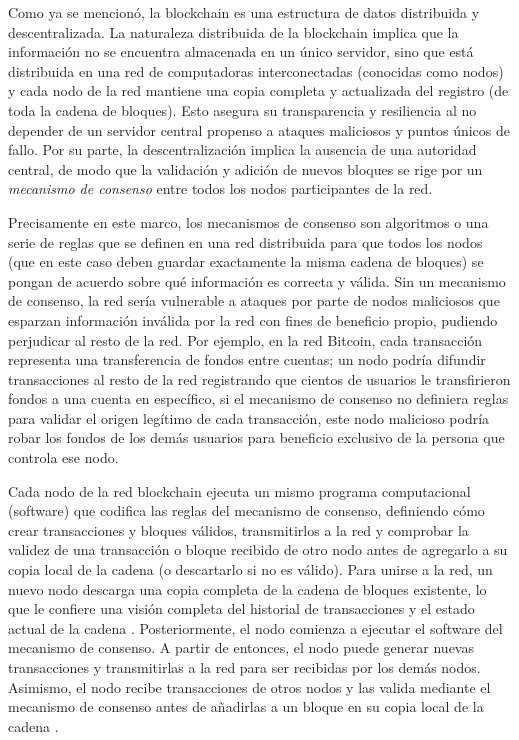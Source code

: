 Como ya se mencionó, la blockchain es una estructura de datos distribuida y descentralizada. La naturaleza distribuida de la blockchain implica que la información no se encuentra almacenada en un único servidor, sino que está distribuida en una red de computadoras interconectadas (conocidas como nodos) y cada nodo de la red mantiene una copia completa y actualizada del registro (de toda la cadena de bloques). Esto asegura su transparencia y resiliencia al no depender de un servidor central \cite{bulkowska2023implementation} propenso a ataques maliciosos y puntos únicos de fallo. Por su parte, la descentralización implica la ausencia de una autoridad central, de modo que la validación y adición de nuevos bloques se rige por un \textit{mecanismo de consenso} entre todos los nodos participantes de la red. 

Precisamente en este marco, los mecanismos de consenso son algoritmos o una serie de reglas que se definen en una red distribuida para que todos los nodos (que en este caso deben guardar exactamente la misma cadena de bloques) se pongan de acuerdo sobre qué información es correcta y válida. Sin un mecanismo de consenso, la red sería vulnerable a ataques por parte de nodos maliciosos que esparzan información inválida por la red con fines de beneficio propio, pudiendo perjudicar al resto de la red. Por ejemplo, en la red Bitcoin, cada transacción representa una transferencia de fondos entre cuentas; un nodo podría difundir transacciones al resto de la red registrando que cientos de usuarios le transfirieron fondos a una cuenta en específico, si el mecanismo de consenso no definiera reglas para validar el origen legítimo de cada transacción, este nodo malicioso podría robar los fondos de los demás usuarios para beneficio exclusivo de la persona que controla ese nodo.

Cada nodo de la red blockchain ejecuta un mismo programa computacional (software) que codifica las reglas del mecanismo de consenso, definiendo cómo crear transacciones y bloques válidos, transmitirlos a la red y comprobar la validez de una transacción o bloque recibido de otro nodo antes de agregarlo a su copia local de la cadena (o descartarlo si no es válido). Para unirse a la red, un nuevo nodo descarga una copia completa de la cadena de bloques existente, lo que le confiere una visión completa del historial de transacciones y el estado actual de la cadena \cite{bulkowska2023implementation}. Posteriormente, el nodo comienza a ejecutar el software del mecanismo de consenso. A partir de entonces, el nodo puede generar nuevas transacciones y transmitirlas a la red para ser recibidas por los demás nodos. Asimismo, el nodo recibe transacciones de otros nodos y las valida mediante el mecanismo de consenso antes de añadirlas a un bloque en su copia local de la cadena \cite{bulkowska2023implementation}.

